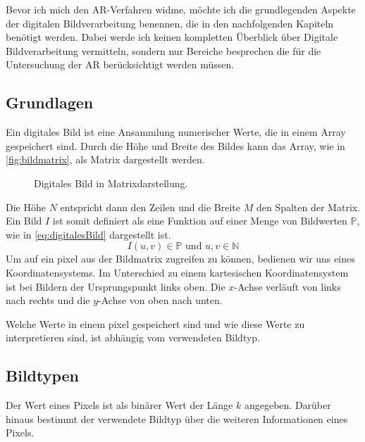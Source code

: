 Bevor ich mich den \gls{AR}-Verfahren widme, möchte ich die grundlegenden Aspekte der digitalen Bildverarbeitung
 benennen, die in den nachfolgenden Kapiteln benötigt werden. Dabei werde ich keinen kompletten Überblick über Digitale
 Bildverarbeitung vermitteln, sondern nur Bereiche besprechen die für die Untersuchung der \gls{AR} berücksichtigt
 werden müssen.

\subsection{Grundlagen} %
\label{sub:grundlagen}

Ein digitales Bild ist eine Ansammlung numerischer Werte, die in einem Array gespeichert sind. Durch die Höhe und Breite des Bildes kann das Array, wie in \autoref{fig:bildmatrix}, als Matrix dargestellt werden.
\begin{figure}[!ht]
	\centering
	
	\caption{Digitales Bild in Matrixdarstellung.}
	\label{fig:bildmatrix}
\end{figure}
Die Höhe $N$ entspricht dann den Zeilen und die Breite $M$ den Spalten der Matrix. Ein Bild $I$ ist somit definiert als
 eine Funktion auf einer Menge von Bildwerten $\mathbb{P}$, wie in \autoref{eq:digitalesBild} dargestellt ist.
\begin{equation}
	I\left(u,v\right)\in\mathbb{P} \text{ und } u,v\in\mathbb{N}
	\label{eq:digitalesBild}
\end{equation}
Um auf ein \gls{pixel} aus der Bildmatrix zugreifen zu können, bedienen wir uns eines Koordinatensystems. Im
 Unterschied zu einem kartesischen Koordinatensystem ist bei Bildern der Ursprungspunkt links oben. Die \(x\)-Achse
 verläuft von links nach rechts und die \(y\)-Achse von oben nach unten. \begin{comment}\\TODO:vgl abbildung\end{comment}
Welche Werte in einem \gls{pixel} gespeichert sind und wie diese Werte zu interpretieren sind, ist abhängig vom
 verwendeten Bildtyp.


\subsection{Bildtypen} %
\label{sub:bildtypen}

Der Wert eines Pixels ist als binärer Wert der Länge $k$ angegeben. Darüber hinaus bestimmt der verwendete Bildtyp
 über die weiteren Informationen eines Pixels.

